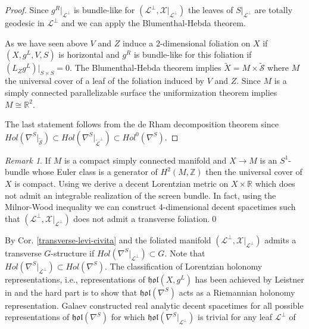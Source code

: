 \documentclass[a4paper,10pt,twoside]{amsart}
\theoremstyle{definition}
\theoremstyle{remark}
\newtheorem{remark}[theorem]{Remark}
\numberwithin{equation}{section}
\begin{document}
\begin{proof}
	Since $g^{R}|_{\mathcal{L}^{\perp}}$ is bundle-like for $(\mathcal{L}^{\perp},\mathcal{X}|_{\mathcal{L}^{\perp}})$ the leaves of
	$S|_{\mathcal{L}^{\perp}}$ are totally geodesic in $\mathcal{L}^{\perp}$ and we can apply the Blumenthal-Hebda theorem.\par
	As we have seen above $V$ and $Z$ induce a 2-dimensional foliation on $X$ if $(X,g^{L},V,S)$ is horizontal and $g^{R}$ is bundle-like for this
	foliation if $(L_{Z}g^{L})|_{S \times S}=0$. The Blumenthal-Hebda theorem implies $\tilde{X}=M \times \tilde{\mathcal{S}}$ where
	$M$ the universal cover of a leaf of the foliation induced by $V$ and $Z$. Since $M$ is a simply connected parallelizable surface the
	uniformization theorem implies $M \cong {\mathbb{R}}^{2}$.\par
	The last statement follows from the de Rham decomposition theorem since
	$Hol(\nabla^{S}|_{\tilde{\mathcal{S}}}) \subset Hol(\nabla^{S}|_{\tilde{\mathcal{L}}^{\perp}}) \subset Hol^{0}(\nabla^{S})$.
\end{proof}
\begin{remark}
	If $M$ is a compact simply connected manifold and $X \rightarrow M$ is an $S^{1}$-bundle whose Euler class is a generator of $H^{2}(M,{\mathbb{Z}})$ then
	the universal cover of $X$ is compact.
	Using \cite{laerz-2008-a} we derive a decent Lorentzian metric on $X \times {\mathbb{R}}$ which does not admit an integrable realization of the screen
	bundle. In fact, using the Milnor-Wood inequality \cite{MR0293655} we can construct 4-dimensional decent spacetimes such that
	$(\mathcal{L}^{\perp},\mathcal{X}|_{\mathcal{L}^{\perp}})$ does not admit a transverse foliation.\qed
\end{remark}
By Cor. \ref{transverse-levi-civita} and \cite[Prop. 1.6]{MR0370617} the foliated manifold $(\mathcal{L}^{\perp},\mathcal{X}|_{\mathcal{L}^{\perp}})$
admits a transverse $G$-structure if $Hol(\nabla^{S}|_{\mathcal{L}^{\perp}}) \subset G$. Note that
$Hol(\nabla^{S}|_{\mathcal{L}^{\perp}}) \subset Hol(\nabla^{S})$. The classification of Lorentzian holonomy representations, i.e., representations of
${\mathfrak{{hol}}}(X,g^{L})$ has been achieved by Leistner in \cite{MR2331527} and the hard part is to show that ${\mathfrak{{hol}}}(\nabla^{S})$ acts as a
Riemannian holonomy representation. Galaev \cite{MR2264404} constructed real analytic decent spacetimes for all possible representations of
${\mathfrak{{hol}}}(\nabla^{S})$ for which ${\mathfrak{{hol}}}(\nabla^{S}|_{\mathcal{L}^{\perp}})$ is trivial for any leaf $\mathcal{L}^{\perp}$ of
\end{document}
